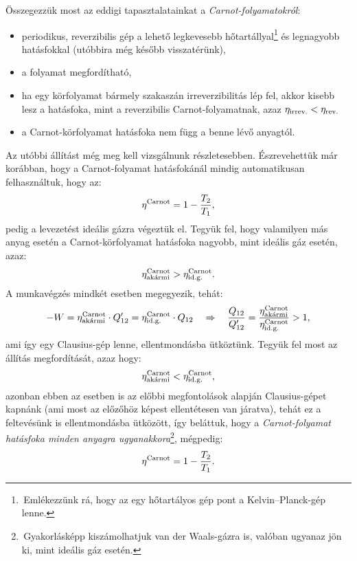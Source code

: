 Összegezzük most az eddigi tapasztalatainkat a \emph{Carnot-folyamatokról}:
\begin{itemize}
	\item periodikus, reverzibilis gép a lehető legkevesebb hőtartállyal\footnote{\,Emlékezzünk rá, hogy az egy hőtartályos gép pont a Kelvin--Planck-gép lenne.} és legnagyobb hatásfokkal (utóbbira még később visszatérünk),
	\item a folyamat megfordítható,
	\item ha egy körfolyamat bármely szakaszán irreverzibilitás lép fel, akkor kisebb lesz a hatásfoka, mint a reverzibilis Carnot-folyamatnak, azaz $\eta_{\textnormal{irrev.}} < \eta_{\textnormal{rev.}}$
	\item a Carnot-körfolyamat hatásfoka nem függ a benne lévő anyagtól.
\end{itemize}
Az utóbbi állítást még meg kell vizsgálnunk részletesebben. Észrevehettük már korábban, hogy a Carnot-folyamat hatásfokánál mindig automatikusan felhasználtuk, hogy az:
\begin{align}
	\eta^{\textnormal{Carnot}}=1-\frac{T_2}{T_1},
\end{align}
pedig a levezetést ideális gázra végeztük el. Tegyük fel, hogy valamilyen más anyag esetén a Carnot-körfolyamat hatásfoka nagyobb, mint ideális gáz esetén, azaz:
\begin{align}
	\eta_{\textnormal{akármi}}^{\textnormal{Carnot}} > \eta_{\textnormal{id.g.}}^{\textnormal{Carnot}}.
\end{align}
A munkavégzés mindkét esetben megegyezik, tehát:
\begin{align}
	-W = \eta_{\textnormal{akármi}}^{\textnormal{Carnot}}\cdot Q_{12}' = \eta_{\textnormal{id.g.}}^{\textnormal{Carnot}}\cdot Q_{12} \quad\Rightarrow\quad \frac{Q_{12}}{Q_{12}'}=\frac{\eta_{\textnormal{akármi}}^{\textnormal{Carnot}}}{\eta_{\textnormal{id.g.}}^{\textnormal{Carnot}}}>1,
\end{align}
ami így egy Clausius-gép lenne, ellentmondásba ütköztünk. Tegyük fel most az állítás megfordítását, azaz hogy:
\begin{align}
	\eta_{\textnormal{akármi}}^{\textnormal{Carnot}} < \eta_{\textnormal{id.g.}}^{\textnormal{Carnot}},
\end{align}
azonban ebben az esetben is az előbbi megfontolások alapján Clausius-gépet kapnánk (ami most az előzőhöz képest ellentétesen van járatva), tehát ez a feltevésünk is ellentmondásba ütközött, így beláttuk, hogy a \emph{Carnot-folyamat hatásfoka minden anyagra ugyanakkora}\footnote{\,Gyakorlásképp kiszámolhatjuk van der Waals-gázra is, valóban ugyanaz jön ki, mint ideális gáz esetén.}, mégpedig:
\begin{align}
	\eta^{\textnormal{Carnot}} = 1-\frac{T_2}{T_1}.
\end{align}

